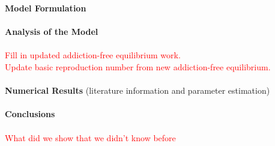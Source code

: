 \documentclass[12pt]{article}
\begin{document}
\textbf{Model Formulation} \\ \\
\textbf{Analysis of the Model} \\ \\
\textcolor{red}{Fill in updated addiction-free equilibrium work.} \\
\textcolor{red}{Update basic reproduction number from new addiction-free equilibrium.} \\ \\
\textbf{Numerical Results} 
(literature information and parameter estimation) \\ \\
\textbf{Conclusions} \\ \\
 \textcolor{red}{What did we show that we didn't know before}



\pagebreak



 
\end{document}
